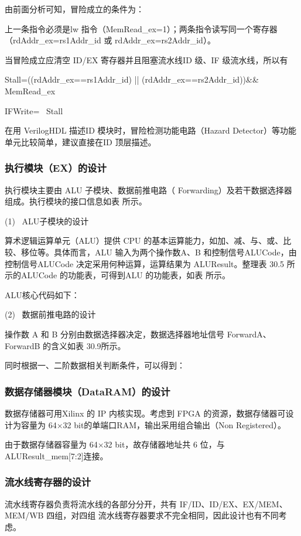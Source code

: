 \documentclass{../source/Experiment}
\begin{document}
        由前面分析可知，冒险成立的条件为：

        上一条指令必须是lw 指令（MemRead\_ex=1）；两条指令读写同一个寄存器（rdAddr\_ex=rs1Addr\_id 或 rdAddr\_ex=rs2Addr\_id）。

        当冒险成立应清空 ID/EX 寄存器并且阻塞流水线ID 级、IF 级流水线，所以有

        Stall=((rdAddr\_ex==rs1Addr\_id) || (rdAddr\_ex==rs2Addr\_id))\&\& MemRead\_ex

        IFWrite= ~Stall

        在用 VerilogHDL 描述ID 模块时，冒险检测功能电路（Hazard Detector）等功能单元比较简单，建议直接在ID 顶层描述。

        \subsubsection{执行模块（EX）的设计}
        执行模块主要由 ALU 子模块、数据前推电路（ Forwarding）及若干数据选择器组成。执行模块的接口信息如表  所示。

        (1) \, ALU子模块的设计

        算术逻辑运算单元（ALU）提供 CPU 的基本运算能力，如加、减、与、或、比较、移位等。具体而言，ALU 输入为两个操作数A、B 和控制信号ALUCode，由控制信号ALUCode 决定采用何种运算，运算结果为 ALUResult。整理表 30.5 所示的ALUCode 的功能表，可得到ALU 的功能表，如表 所示。

        ALU核心代码如下：

        (2) \, 数据前推电路的设计

        操作数 A 和 B 分别由数据选择器决定，数据选择器地址信号 ForwardA、ForwardB 的含义如表 30.9所示。

        同时根据一、二阶数据相关判断条件，可以得到：

        
        \subsubsection{数据存储器模块（DataRAM）的设计}
        数据存储器可用Xilinx 的 IP 内核实现。考虑到 FPGA 的资源，数据存储器可设计为容量为 64×32 bit的单端口RAM，输出采用组合输出（Non Registered）。

        由于数据存储器容量为 64×32 bit，故存储器地址共 6 位，与ALUResult\_mem[7:2]连接。


        \subsubsection{流水线寄存器的设计}
        流水线寄存器负责将流水线的各部分分开，共有 IF/ID、ID/EX、EX/MEM、MEM/WB 四组，对四组
        流水线寄存器要求不完全相同，因此设计也有不同考虑。
        
\end{document}
